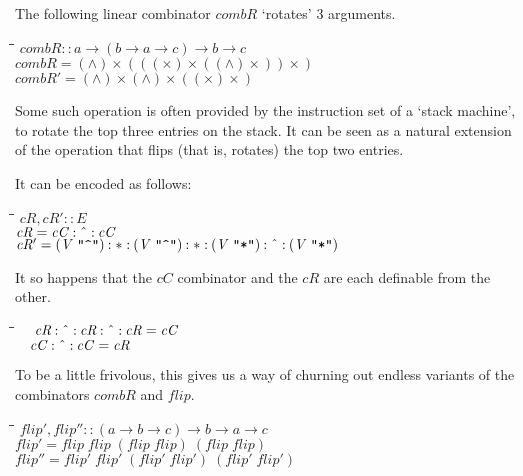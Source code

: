 \documentclass{article}
\newlength{\lwidth}\setlength{\lwidth}{4.5cm}
\newlength{\cwidth}\setlength{\cwidth}{8mm} %
\newcommand{\Conid}[1]{\mathit{#1}}
\newcommand{\Varid}[1]{\mathit{#1}}
\begin{document}
The following linear combinator \ensuremath{\Varid{combR}} `rotates' 3 arguments.
\begin{tabbing}
\qquad\=\hspace{\lwidth}\=\hspace{\cwidth}\=\+\kill
${\Varid{combR}\mathbin{::}\Varid{a}\to (\Varid{b}\to \Varid{a}\to \Varid{c})\to \Varid{b}\to \Varid{c}}$\\
${\Varid{combR}\mathrel{=}(\wedge)\times(((\times)\times((\wedge)\times))\times)}$\\
${\Varid{combR'}\mathrel{=}(\wedge)\times(\wedge)\times((\times)\times)}$
\end{tabbing}Some such operation is often provided by the instruction
set of a `stack machine', to rotate the top three entries
on the stack. It can be seen as a natural extension of the
operation that flips (that is, rotates) the top two entries.

It can be encoded as follows:
\begin{tabbing}
\qquad\=\hspace{\lwidth}\=\hspace{\cwidth}\=\+\kill
${\Varid{cR},\Varid{cR'}\mathbin{::}\Conid{E}}$\\
${\Varid{cR}\mathrel{=}\Varid{cC}\mathbin{:\char94 :}\Varid{cC}}$\\
${\Varid{cR'}\mathrel{=}(\Conid{V}\;\text{\ttfamily \char34 \char94 \char34})\mathbin{:*:}(\Conid{V}\;\text{\ttfamily \char34 \char94 \char34})\mathbin{:*:}(\Conid{V}\;\text{\ttfamily \char34 *\char34})\mathbin{:\char94 :}(\Conid{V}\;\text{\ttfamily \char34 *\char34})}$
\end{tabbing}
It so happens that the \ensuremath{\Varid{cC}} combinator and the \ensuremath{\Varid{cR}} are each
definable from the other. 

\begin{tabbing}
\qquad\=\hspace{\lwidth}\=\hspace{\cwidth}\=\+\kill
${\hskip1.00em\relax\Varid{cR}\mathbin{:\char94 :}\Varid{cR}\mathbin{:\char94 :}\Varid{cR}\mathrel{=}\Varid{cC}}$\\
${\hskip1.00em\relax\Varid{cC}\mathbin{:\char94 :}\Varid{cC}\mathrel{=}\Varid{cR}}$
\end{tabbing}
To be a little frivolous, this gives us a way of churning out
endless variants of the combinators \ensuremath{\Varid{combR}} and \ensuremath{\Varid{flip}}.

\begin{tabbing}
\qquad\=\hspace{\lwidth}\=\hspace{\cwidth}\=\+\kill
${\Varid{flip'},\Varid{flip''}\mathbin{::}(\Varid{a}\to \Varid{b}\to \Varid{c})\to \Varid{b}\to \Varid{a}\to \Varid{c}}$\\
${\Varid{flip'}\mathrel{=}\Varid{flip}\;\Varid{flip}\;(\Varid{flip}\;\Varid{flip})\;(\Varid{flip}\;\Varid{flip})}$\\
${\Varid{flip''}\mathrel{=}\Varid{flip'}\;\Varid{flip'}\;(\Varid{flip'}\;\Varid{flip'})\;(\Varid{flip'}\;\Varid{flip'})}$
\end{tabbing}
\end{document}
